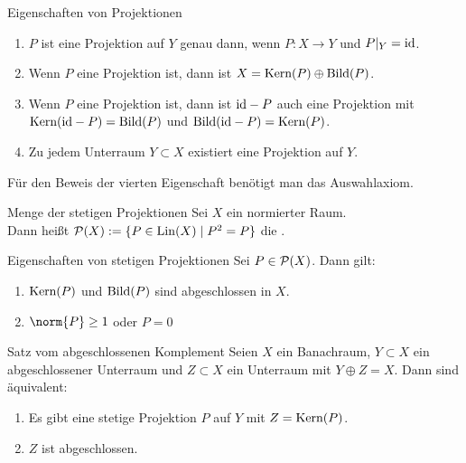 \begin{Lemma}{Eigenschaften von Projektionen}
    \begin{enumerate}
        \item
        $P$ ist eine Projektion auf $Y$ genau dann, wenn $P\colon X \rightarrow Y$ und
        $P|_Y = \id$.

        \item
        Wenn $P$ eine Projektion ist, dann ist $X = \Kern(P) \oplus \Bild(P)$.

        \item
        Wenn $P$ eine Projektion ist, dann ist $\id - P$ auch eine Projektion mit\\
        $\Kern(\id - P) = \Bild(P)$ und $\Bild(\id - P) = \Kern(P)$.

        \item
        Zu jedem Unterraum $Y \subset X$ existiert eine Projektion auf $Y$.
    \end{enumerate}
\end{Lemma}

\begin{Bem}
    Für den Beweis der vierten Eigenschaft benötigt man das Auswahlaxiom.
\end{Bem}

\linie

\begin{Def}{Menge der stetigen Projektionen}
    Sei $X$ ein normierter Raum.\\
    Dann heißt $\P(X) := \{P \in \Lin(X) \;|\; P^2 = P\}$ die
    .
\end{Def}

\begin{Lemma}{Eigenschaften von stetigen Projektionen}
    Sei $P \in \P(X)$.
    Dann gilt:
    \begin{enumerate}
        \item
        $\Kern(P)$ und $\Bild(P)$ sind abgeschlossen in $X$.

        \item
        $\norm{P} \ge 1$ oder $P = 0$
    \end{enumerate}
\end{Lemma}

\linie

\begin{Satz}{Satz vom abgeschlossenen Komplement}
    Seien $X$ ein Banachraum, $Y \subset X$ ein abgeschlossener Unterraum und
    $Z \subset X$ ein Unterraum mit $Y \oplus Z = X$.
    Dann sind äquivalent:
    \begin{enumerate}
        \item
        Es gibt eine stetige Projektion $P$ auf $Y$ mit $Z = \Kern(P)$.

        \item
        $Z$ ist abgeschlossen.
    \end{enumerate}
\end{Satz}

